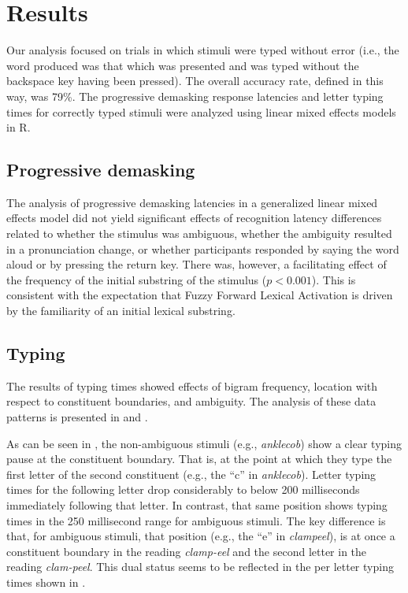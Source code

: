\documentclass[output=paper]{langsci/langscibook}
\begin{document}
\section{Results}\label{sec:libben:3}

Our analysis focused on trials in which stimuli were typed without error (i.e., the word produced was that which was presented and was typed without the backspace key having been pressed).  The overall accuracy rate, defined in this way, was 79\%. The progressive demasking response latencies and letter typing times for correctly typed stimuli were analyzed using linear mixed effects models in R.

\subsection{Progressive demasking}\label{sec:libben:3.1}

The analysis of progressive demasking latencies in a generalized linear mixed effects model did not yield significant effects of recognition latency differences related to whether the stimulus was ambiguous, whether the ambiguity resulted in a pronunciation change, or whether participants responded by saying the word aloud or by pressing the return key. There was, however, a facilitating effect of the frequency of the initial substring of the stimulus ($p<0.001$). This is consistent with the expectation that Fuzzy Forward Lexical Activation is driven by the familiarity of an initial lexical substring.

\subsection{Typing}\label{sec:libben:3.2}

The results of typing times showed effects of bigram frequency, location with respect to constituent boundaries, and ambiguity.  The analysis of these data patterns is presented in  and . 

As can be seen in , the non-ambiguous stimuli (e.g., \textit{anklecob}) show a clear typing pause at the constituent boundary. That is, at the point at which they type the first letter of the second constituent (e.g., the “c” in \textit{anklecob}). Letter typing times for the following letter drop considerably to below 200 milliseconds immediately following that letter. In contrast, that same position shows typing times in the 250 millisecond range for ambiguous stimuli. The key difference is that, for ambiguous stimuli, that position (e.g., the “e” in \textit{clampeel}), is at once a constituent boundary in the reading \textit{clamp-eel} and the second letter in the reading \textit{clam-peel}. This dual status seems to be reflected in the per letter typing times shown in . 
\end{document}
